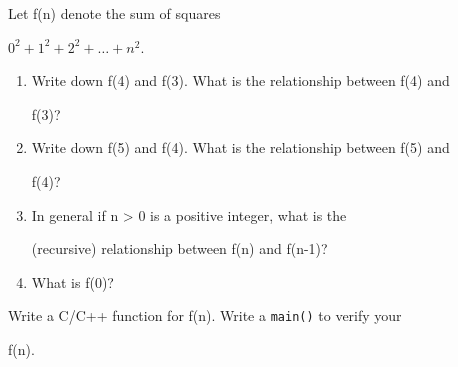 Let f(n) denote the sum of squares

$0^2 + 1^2 + 2^2 + \ldots + n^2$.



\begin{enumerate}

\item[(a)] Write down f(4) and f(3). What is the relationship between f(4) and

  f(3)?

\item[(b)] Write down f(5) and f(4). What is the relationship between f(5) and

  f(4)?

\item[(c)] In general if n > 0 is a positive integer, what is the

  (recursive) relationship between f(n) and f(n-1)?

\item[(d)] What is f(0)?

\end{enumerate}



Write a C/C++ function for f(n). Write a \texttt{main()} to verify your

f(n).

